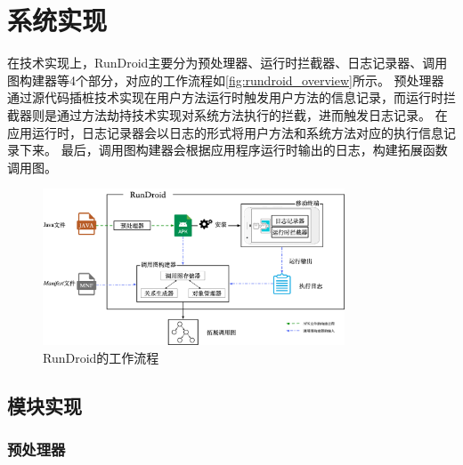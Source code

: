 
\chapter{系统实现 }

\label{chp:implement}




在技术实现上，RunDroid主要分为预处理器、运行时拦截器、日志记录器、调用图构建器等4个部分，对应的工作流程如\autoref{fig:rundroid_overview}所示。
预处理器通过源代码插桩技术实现在用户方法运行时触发用户方法的信息记录，而运行时拦截器则是通过方法劫持技术实现对系统方法执行的拦截，进而触发日志记录。
在应用运行时，日志记录器会以日志的形式将用户方法和系统方法对应的执行信息记录下来。
最后，调用图构建器会根据应用程序运行时输出的日志，构建拓展函数调用图。

\begin{figure}[!hb]
	\centering
	\includegraphics[width=0.8\textwidth]{./Figures/rundroid-overview.png}
	\caption{ RunDroid的工作流程}
	\label{fig:rundroid_overview}
\end{figure}


\section{模块实现}



\subsection{预处理器}

